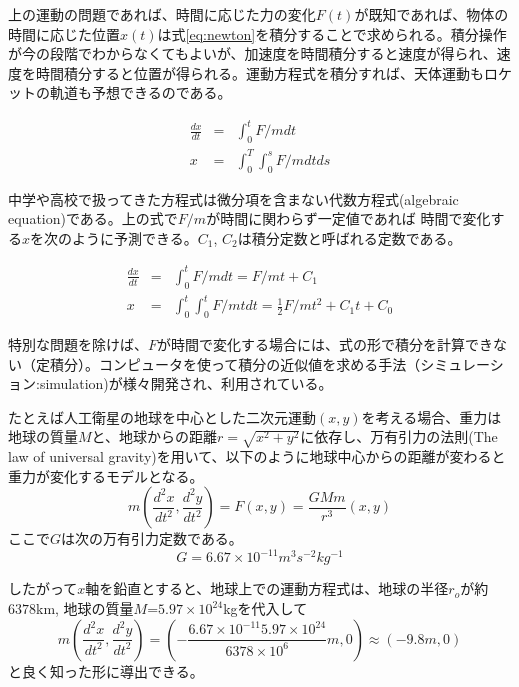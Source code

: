 \documentclass[times, 10pt,dvipdfmx]{jsarticle}
\begin{document}
上の運動の問題であれば、時間に応じた力の変化$F(t)$が既知であれば、物体の時間に応じた位置$x(t)$は式\ref{eq:newton}を積分することで求められる。積分操作が今の段階でわからなくてもよいが、加速度を時間積分すると速度が得られ、速度を時間積分すると位置が得られる。運動方程式を積分すれば、天体運動もロケットの軌道も予想できるのである。

\begin{eqnarray}
\frac{dx}{dt} &=& \int_0^t F/m dt \\
x &=& \int_0^T \int_0^s F/m dt ds
\end{eqnarray}

中学や高校で扱ってきた方程式は微分項を含まない代数方程式(algebraic equation)である。上の式で$F/m$が時間に関わらず一定値であれば
時間で変化する$x$を次のように予測できる。$C_1$, $C_2$は積分定数と呼ばれる定数である。

\begin{eqnarray}
\frac{dx}{dt} &=& \int_0^t F/m dt = F/m t + C_1 \\
x &=& \int_0^t \int_0^t F/m t  dt = \frac{1}{2} F/m t^2  + C_1t + C_0
\end{eqnarray}

\vspace{5mm}
特別な問題を除けば、$F$が時間で変化する場合には、式の形で積分を計算できない（定積分）。コンピュータを使って積分の近似値を求める手法（シミュレーション:simulation)が様々開発され、利用されている。

\vspace{5mm}

たとえば人工衛星の地球を中心とした二次元運動$(x, y)$を考える場合、重力は地球の質量$M$と、地球からの距離$r = \sqrt{x^2 + y^2}$に依存し、万有引力の法則(The law of universal gravity)を用いて、以下のように地球中心からの距離が変わると重力が変化するモデルとなる。
\begin{equation}
m(\frac{d^2 x}{dt^2}, \frac{d^2 y}{dt^2}) = F(x, y) = \frac{GMm}{r^3}(x, y)
\label{eq:ge}
\end{equation}
ここで$G$は次の万有引力定数である。
\begin{equation}
G = 6.67 \times 10^{-11} m^3 s^{-2} kg^{-1}
\end{equation}

したがって$x$軸を鉛直とすると、地球上での運動方程式は、地球の半径$r_o$が約$6378$km, 地球の質量$M$=$5.97 \times 10^{24}$kgを代入して
\begin{equation}
m(\frac{d^2 x}{dt^2}, \frac{d^2 y}{dt^2})  =(-\frac{6.67 \times 10^{-11} 5.97 \times 10^{24}}{6378 \times 10^{6}}m, 0)\approx (-9.8m, 0)
\end{equation}
と良く知った形に導出できる。
\end{document}
